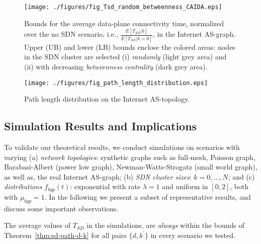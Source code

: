 


\begin{figure}
\centering\texttt{[image: ./figures/fig\_Tsd\_random\_betweenness\_CAIDA.eps]}
\caption{Bounds for the average data-plane connectivity time, normalized over the no SDN scenario, i.e., $\frac{E[T_{SD}|k]}{E[T_{SD}|k=0]}$, in the Internet AS-graph. Upper (UB) and lower (LB) bounds enclose the colored areas: nodes in the SDN cluster are selected (i) \textit{randomly} (light grey area) and (ii) with decreasing \textit{betweenness centrality} (dark grey area).}
\label{fig:bounds-random-betweenness-CAIDA}
\end{figure}


\begin{figure}
\centering
\texttt{[image: ./figures/fig\_path\_length\_distribution.eps]}
\caption{Path length distribution on the Internet AS-topology.}
\label{fig:path-length-distribution}
\end{figure}


\subsection{Simulation Results and Implications}
To validate our theoretical results, we conduct simulations on scenarios with varying (a) \textit{network topologies}: synthetic graphs such as full-mesh, Poisson graph, Barabasi-Albert (power low graph), Newman-Watts-Strogatz (small world graph), as well as, the real Internet AS-graph; (b) \textit{SDN cluster sizes}: $k=0,...,N$; and (c) \textit{distributions} $f_{bgp}(t)$: exponential with rate $\lambda=1$ and uniform in $[0,2]$, both with $\mu_{bgp}=1$. In the following we present a subset of representative results, and discuss some important observations.

The average values of $T_{SD}$ in the simulations, are \textit{always} within the bounds of Theorem~\ref{thm:sd-path-d-k} for all pairs $\{d,k^{'}\}$ in every scenario we tested.

